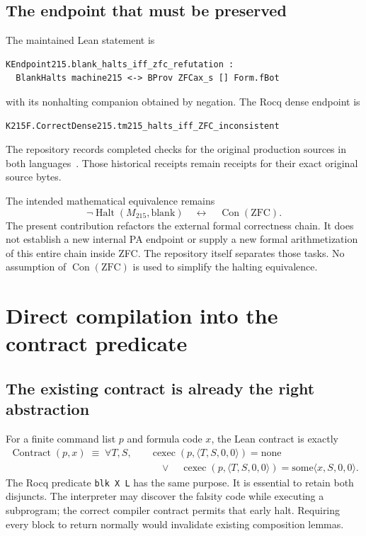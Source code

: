 \documentclass[11pt]{article}
\theoremstyle{definition}\newtheorem{definition}[theorem]{Definition}
\newcommand{\Con}{\operatorname{Con}}
\newcommand{\Halt}{\operatorname{Halt}}
\newcommand{\ctr}{\operatorname{Contract}}
\newcommand{\code}[1]{\texttt{#1}}
\begin{document}
\subsection{The endpoint that must be preserved}

The maintained Lean statement is
\begin{lstlisting}
KEndpoint215.blank_halts_iff_zfc_refutation :
  BlankHalts machine215 <-> BProv ZFCax_s [] Form.fBot
\end{lstlisting}
with its nonhalting companion obtained by negation. The Rocq dense endpoint is
\begin{lstlisting}
K215F.CorrectDense215.tm215_halts_iff_ZFC_inconsistent
\end{lstlisting}
The repository records completed checks for the original production sources in
both languages~\cite{candidate,rocqverify}. Those historical receipts remain
receipts for their exact original source bytes.

The intended mathematical equivalence remains
\[
  \neg\Halt(M_{215},\mathrm{blank})\quad\longleftrightarrow\quad\Con(\mathrm{ZFC}).
\]
The present contribution refactors the external formal correctness chain. It
does not establish a new internal PA endpoint or supply a new formal
arithmetization of this entire chain inside ZFC. The repository itself separates
those tasks. No assumption of \(\Con(\mathrm{ZFC})\) is used to simplify the
halting equivalence.

\section{Direct compilation into the contract predicate}
\label{sec:fusion}

\subsection{The existing contract is already the right abstraction}

For a finite command list \(p\) and formula code \(x\), the Lean contract is
exactly
\begin{align}
\ctr(p,x)\;\equiv\;\forall T,S,\quad
 &\operatorname{cexec}(p,\langle T,S,0,0\rangle)=\mathrm{none}\nonumber\\[-2pt]
 &\quad\lor\quad
 \operatorname{cexec}(p,\langle T,S,0,0\rangle)
   =\mathrm{some}\langle x,S,0,0\rangle.
\label{eq:contract}
\end{align}
The Rocq predicate \code{blk X L} has the same purpose. It is essential to retain
both disjuncts. The interpreter may discover the falsity code while executing a
subprogram; the correct compiler contract permits that early halt. Requiring
every block to return normally would invalidate existing composition lemmas.
\end{document}
